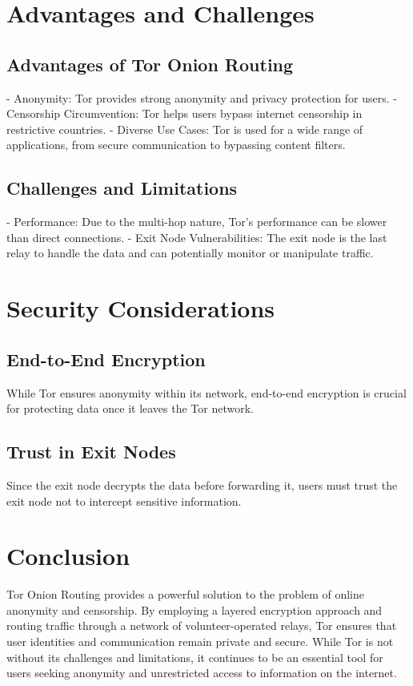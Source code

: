 \documentclass{article}
\begin{document}
\section{Advantages and Challenges}
\subsection{Advantages of Tor Onion Routing}
- Anonymity: Tor provides strong anonymity and privacy protection for users.
- Censorship Circumvention: Tor helps users bypass internet censorship in restrictive countries.
- Diverse Use Cases: Tor is used for a wide range of applications, from secure communication to bypassing content filters.

\subsection{Challenges and Limitations}
- Performance: Due to the multi-hop nature, Tor's performance can be slower than direct connections.
- Exit Node Vulnerabilities: The exit node is the last relay to handle the data and can potentially monitor or manipulate traffic.

\section{Security Considerations}
\subsection{End-to-End Encryption}
While Tor ensures anonymity within its network, end-to-end encryption is crucial for protecting data once it leaves the Tor network.

\subsection{Trust in Exit Nodes}
Since the exit node decrypts the data before forwarding it, users must trust the exit node not to intercept sensitive information.

\section{Conclusion}
Tor Onion Routing provides a powerful solution to the problem of online anonymity and censorship. By employing a layered encryption approach and routing traffic through a network of volunteer-operated relays, Tor ensures that user identities and communication remain private and secure. While Tor is not without its challenges and limitations, it continues to be an essential tool for users seeking anonymity and unrestricted access to information on the internet.
\end{document}
